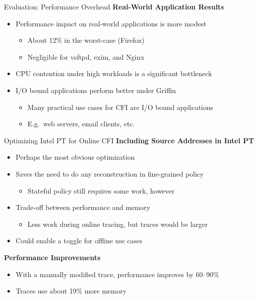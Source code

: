\documentclass[12pt, dvipsnames, aspectratio=169]{beamer}
\begin{document}
\begin{frame}[c]{Evaluation: Performance Overhead}{}
  {\bf Real-World Application Results}
  \begin{itemize}
    \item Performance impact on real-world applications is more modest
    \begin{itemize}
      \item About 12\% in the worst-case (Firefox)
      \item Negligible for vsftpd, exim, and Nginx
    \end{itemize}
    \item CPU contention under high workloads is a significant bottleneck
    \item I/O bound applications perform better under Griffin
    \begin{itemize}
      \item Many practical use cases for CFI are I/O bound applications
      \item E.g.~web servers, email clients, etc.
    \end{itemize}
  \end{itemize}
\end{frame}

\begin{frame}[c]{Optimizing Intel PT for Online CFI}{}
  {\bf Including Source Addresses in Intel PT}
  \begin{itemize}
    \item Perhaps the most obvious optimization
    \item Saves the need to do any reconstruction in fine-grained policy
    \begin{itemize}
      \item Stateful policy still requires some work, however
    \end{itemize}
    \item Trade-off between performance and memory
    \begin{itemize}
      \item Less work during online tracing, but traces would be larger
    \end{itemize}
    \item Could enable a toggle for offline use cases
  \end{itemize}

  \vfill
  {\bf Performance Improvements}
  \begin{itemize}
    \item With a manually modified trace, performance improves by 60--90\%
    \item Traces use about 19\% more memory
  \end{itemize}
\end{frame}
\end{document}
